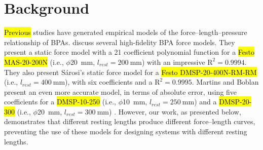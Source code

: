 \documentclass[actuators,article,accept,pdftex,moreauthors]{Definitions/mdpi}
\begin{document}
\section{Background}

\hl{Previous} %
 studies have generated empirical models of the force--length--pressure relationship of BPAs. \citet{sarosi_comparative_2017} discuss several high-fidelity BPA force models. They present a static force model with a 21 coefficient polynomial function for a \hl{Festo MAS-20-200N} %
 (i.e., $\phi$\qty{20}{\mm}, $l_{rest}=\qty{200}{\mm}$) with an impressive $\text{R}^2=0.9994$. They also present Sárosi's static force model for a \hl{Festo DMSP-20-400N-RM-RM} (i.e.,  %
 $l_{rest}=\qty{400}{\mm}$), with six coefficients and a $\text{R}^2=0.9995$. Martins and Boblan present an even more accurate model, in terms of absolute error, using five coefficients for a \hl{DMSP-10-250} (i.e., $\phi$\qty{10}{\mm}, $l_{rest}=\qty{250}{\mm}$) and a \hl{DMSP-20-300} (i.e., $\phi$\qty{20}{\mm}, $l_{rest}=\qty{300}{\mm}$) \citep{martens_modeling_2017}.  However, our work, as presented below, demonstrates that different resting lengths produce different force--length curves, preventing the use of these models for designing systems with different resting lengths.
\end{document}
